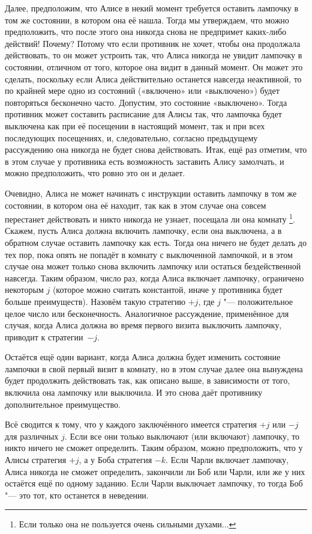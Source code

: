 \documentclass[twoside]{book}
\begin{document}
Далее, предположим, что Алисе в некий момент требуется оставить лампочку в том же состоянии, в котором она её нашла.
Тогда мы утверждаем, что можно предположить, что после этого она никогда снова не предпримет каких-либо действий!
Почему?
Потому что если противник не хочет, чтобы она продолжала действовать, то он может устроить так, что Алиса никогда не увидит лампочку в состоянии, отличном от того, которое она видит в данный момент.
Он может это сделать, поскольку если Алиса действительно останется навсегда неактивной, то по крайней мере одно из состояний («включено» или «выключено») будет повторяться бесконечно часто.
Допустим, это состояние «выключено».
Тогда противник может составить расписание для Алисы так, что лампочка будет выключена как при её посещении в настоящий момент, так и при всех последующих посещениях, и, следовательно, согласно предыдущему рассуждению она никогда не будет снова действовать.
Итак, ещё раз отметим, что в этом случае у противника есть возможность заставить Алису замолчать, и можно предположить, что ровно это он и делает.

Очевидно, Алиса не может начинать с инструкции оставить лампочку в том же состоянии, в котором она её находит, так как в этом случае она совсем перестанет действовать и никто никогда не узнает, посещала ли она комнату%
\footnote{Если только она не пользуется очень сильными духами...}.
Скажем, пусть Алиса должна включить лампочку, если она выключена, а в обратном случае оставить лампочку как есть.
Тогда она ничего не будет делать до тех пор, пока опять не попадёт в комнату с выключенной лампочкой, и в этом случае она может только снова включить лампочку или остаться бездейственной навсегда.
Таким образом, число раз, когда Алиса включает лампочку, ограничено некоторым $j$ (которое можно считать константой, иначе у противника будет больше преимуществ).
Назовём такую стратегию $+j$, где $j$ "--- положительное целое число или бесконечность.
Аналогичное рассуждение, применённое для случая, когда Алиса должна во время первого визита выключить лампочку, приводит к стратегии~$-j$.

Остаётся ещё один вариант, когда Алиса должна будет изменить состояние лампочки в свой первый визит в комнату, но в этом случае далее она вынуждена будет продолжить действовать так, как описано выше, в зависимости от того, включила она лампочку или выключила.
И это снова даёт противнику дополнительное преимущество.

Всё сводится к тому, что у каждого заключённого имеется стратегия $+j$ или $-j$ для различных $j$.
Если все они только выключают (или включают) лампочку, то никто ничего не сможет определить.
Таким образом, можно предположить, что у Алисы стратегия $+j$, а у Боба стратегия $-k$.
Если Чарли включает лампочку, Алиса никогда не сможет определить, закончили ли Боб или Чарли, или же у них остаётся ещё по одному заданию.
Если Чарли выключает лампочку, то тогда Боб "--- это тот, кто останется в неведении.
\end{document}
